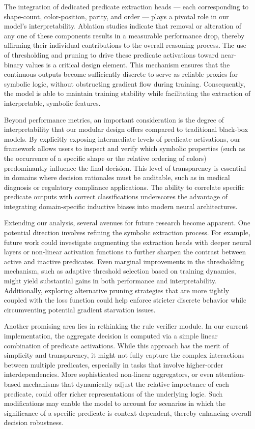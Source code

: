 \documentclass{article}
\begin{document}
The integration of dedicated predicate extraction heads — each corresponding to shape-count, color-position, parity, and order — plays a pivotal role in our model's interpretability. Ablation studies indicate that removal or alteration of any one of these components results in a measurable performance drop, thereby affirming their individual contributions to the overall reasoning process. The use of thresholding and pruning to drive these predicate activations toward near-binary values is a critical design element. This mechanism ensures that the continuous outputs become sufficiently discrete to serve as reliable proxies for symbolic logic, without obstructing gradient flow during training. Consequently, the model is able to maintain training stability while facilitating the extraction of interpretable, symbolic features.

Beyond performance metrics, an important consideration is the degree of interpretability that our modular design offers compared to traditional black-box models. By explicitly exposing intermediate levels of predicate activations, our framework allows users to inspect and verify which symbolic properties (such as the occurrence of a specific shape or the relative ordering of colors) predominantly influence the final decision. This level of transparency is essential in domains where decision rationales must be auditable, such as in medical diagnosis or regulatory compliance applications. The ability to correlate specific predicate outputs with correct classifications underscores the advantage of integrating domain-specific inductive biases into modern neural architectures.

Extending our analysis, several avenues for future research become apparent. One potential direction involves refining the symbolic extraction process. For example, future work could investigate augmenting the extraction heads with deeper neural layers or non-linear activation functions to further sharpen the contrast between active and inactive predicates. Even marginal improvements in the thresholding mechanism, such as adaptive threshold selection based on training dynamics, might yield substantial gains in both performance and interpretability. Additionally, exploring alternative pruning strategies that are more tightly coupled with the loss function could help enforce stricter discrete behavior while circumventing potential gradient starvation issues.

Another promising area lies in rethinking the rule verifier module. In our current implementation, the aggregate decision is computed via a simple linear combination of predicate activations. While this approach has the merit of simplicity and transparency, it might not fully capture the complex interactions between multiple predicates, especially in tasks that involve higher-order interdependencies. More sophisticated non-linear aggregators, or even attention-based mechanisms that dynamically adjust the relative importance of each predicate, could offer richer representations of the underlying logic. Such modifications may enable the model to account for scenarios in which the significance of a specific predicate is context-dependent, thereby enhancing overall decision robustness.
\end{document}
